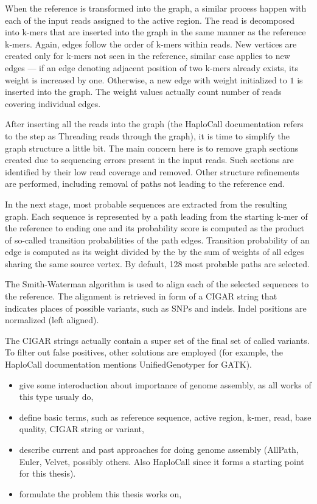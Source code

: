 When the reference is transformed into the graph, a similar process happen with each of the input reads assigned to the active region. The read is decomposed into k-mers that are inserted into the graph in the same manner as the reference k-mers. Again, edges follow the order of k-mers within reads.  New vertices are created only for k-mers not seen in the reference, similar case applies to new edges --- if an edge denoting adjacent position of two k-mers already exists, its weight is increased by one. Otherwise, a new edge with weight initialized to $1$ is inserted into the graph. The weight values actually count number of reads covering individual edges.

After inserting all the reads into the graph (the HaploCall documentation refers to the step as Threading reads through the graph), it is time to simplify the graph structure a little bit. The main concern here is to remove graph sections created due to sequencing errors present in the input reads. Such sections are identified by their low read coverage and removed. Other structure refinements are performed, including removal of paths not leading to the reference end.

In the next stage, most probable sequences are extracted from the resulting graph. Each sequence is represented by a path leading from the starting k-mer of the reference to ending one and its probability score is computed as the product of so-called transition probabilities of the path edges. Transition probability of an edge is computed as its weight divided by the by the sum of weights of all edges sharing the same source vertex. By default, 128 most probable paths are selected.

 The Smith-Waterman algorithm is used to align each of the selected sequences to the reference. The alignment is retrieved in form of a CIGAR string that indicates places of possible variants, such as SNPs and indels. Indel positions are normalized (left aligned). 

The CIGAR strings actually contain a super set of the final set of called variants. To filter out false positives, other solutions are employed (for example, the HaploCall documentation mentions UnifiedGenotyper for GATK).

\begin{itemize}
\item give some interoduction about importance of genome assembly, as all works of this type usualy do,
\item define basic terms, such as reference sequence, active region, k-mer, read, base quality, CIGAR string or variant,
\item describe current and past approaches for doing genome assembly (AllPath, Euler, Velvet, possibly others. Also HaploCall since it forms a starting point for this thesis). 
\item formulate the problem this thesis works on,
\end{itemize}
